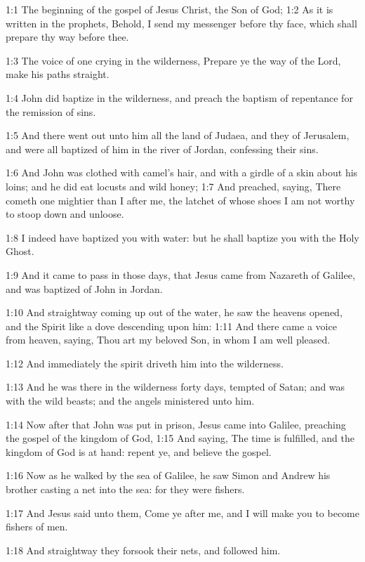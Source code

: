 

1:1 The beginning of the gospel of Jesus Christ, the Son of God; 1:2 As it is written in the prophets, Behold, I send my messenger before thy face, which shall prepare thy way before thee.

1:3 The voice of one crying in the wilderness, Prepare ye the way of the Lord, make his paths straight.

1:4 John did baptize in the wilderness, and preach the baptism of repentance for the remission of sins.

1:5 And there went out unto him all the land of Judaea, and they of Jerusalem, and were all baptized of him in the river of Jordan, confessing their sins.

1:6 And John was clothed with camel's hair, and with a girdle of a skin about his loins; and he did eat locusts and wild honey; 1:7 And preached, saying, There cometh one mightier than I after me, the latchet of whose shoes I am not worthy to stoop down and unloose.

1:8 I indeed have baptized you with water: but he shall baptize you with the Holy Ghost.

1:9 And it came to pass in those days, that Jesus came from Nazareth of Galilee, and was baptized of John in Jordan.

1:10 And straightway coming up out of the water, he saw the heavens opened, and the Spirit like a dove descending upon him: 1:11 And there came a voice from heaven, saying, Thou art my beloved Son, in whom I am well pleased.

1:12 And immediately the spirit driveth him into the wilderness.

1:13 And he was there in the wilderness forty days, tempted of Satan; and was with the wild beasts; and the angels ministered unto him.

1:14 Now after that John was put in prison, Jesus came into Galilee, preaching the gospel of the kingdom of God, 1:15 And saying, The time is fulfilled, and the kingdom of God is at hand: repent ye, and believe the gospel.

1:16 Now as he walked by the sea of Galilee, he saw Simon and Andrew his brother casting a net into the sea: for they were fishers.

1:17 And Jesus said unto them, Come ye after me, and I will make you to become fishers of men.

1:18 And straightway they forsook their nets, and followed him.

